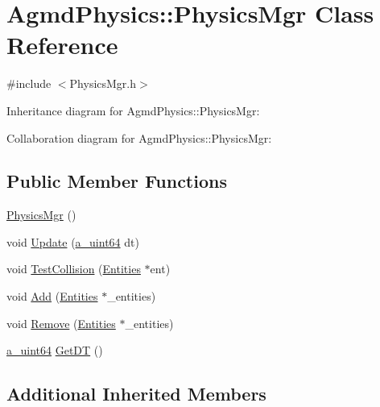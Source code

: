 \hypertarget{class_agmd_physics_1_1_physics_mgr}{\section{Agmd\+Physics\+:\+:Physics\+Mgr Class Reference}
\label{class_agmd_physics_1_1_physics_mgr}
}


{\ttfamily \#include $<$Physics\+Mgr.\+h$>$}



Inheritance diagram for Agmd\+Physics\+:\+:Physics\+Mgr\+:


Collaboration diagram for Agmd\+Physics\+:\+:Physics\+Mgr\+:
\subsection*{Public Member Functions}
\begin{DoxyCompactItemize}
\item 
\hyperlink{class_agmd_physics_1_1_physics_mgr_a49a3374b7e1aa9634c35aaf00b1a1b76}{Physics\+Mgr} ()
\item 
void \hyperlink{class_agmd_physics_1_1_physics_mgr_a9b19929493f6226bcd74637d6d5ebd54}{Update} (\hyperlink{_common_defines_8h_a6c5192ec3c55d6e5b13d2dbaa082bdea}{a\+\_\+uint64} dt)
\item 
void \hyperlink{class_agmd_physics_1_1_physics_mgr_a04d6cd70454628c29cfbfe27451a5b17}{Test\+Collision} (\hyperlink{class_agmd_physics_1_1_entities}{Entities} $\ast$ent)
\item 
void \hyperlink{class_agmd_physics_1_1_physics_mgr_abdbceffd5e97cce0c687979104267542}{Add} (\hyperlink{class_agmd_physics_1_1_entities}{Entities} $\ast$\+\_\+entities)
\item 
void \hyperlink{class_agmd_physics_1_1_physics_mgr_ae353a5e4419f228a82e778eef35155a9}{Remove} (\hyperlink{class_agmd_physics_1_1_entities}{Entities} $\ast$\+\_\+entities)
\item 
\hyperlink{_common_defines_8h_a6c5192ec3c55d6e5b13d2dbaa082bdea}{a\+\_\+uint64} \hyperlink{class_agmd_physics_1_1_physics_mgr_a3a31e8c7237b0638c5fc115c01e3316d}{Get\+D\+T} ()
\end{DoxyCompactItemize}
\subsection*{Additional Inherited Members}


